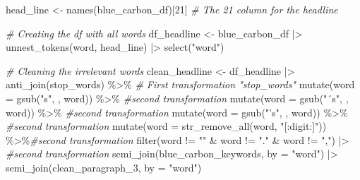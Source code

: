 \documentclass[
]{article}
\newenvironment{Shaded}{\begin{snugshade}}{\end{snugshade}}
\newcommand{\AttributeTok}[1]{\textcolor[rgb]{0.77,0.63,0.00}{#1}}
\newcommand{\CommentTok}[1]{\textcolor[rgb]{0.56,0.35,0.01}{\textit{#1}}}
\newcommand{\DecValTok}[1]{\textcolor[rgb]{0.00,0.00,0.81}{#1}}
\newcommand{\FunctionTok}[1]{\textcolor[rgb]{0.00,0.00,0.00}{#1}}
\newcommand{\NormalTok}[1]{#1}
\newcommand{\OtherTok}[1]{\textcolor[rgb]{0.56,0.35,0.01}{#1}}
\newcommand{\SpecialCharTok}[1]{\textcolor[rgb]{0.00,0.00,0.00}{#1}}
\newcommand{\StringTok}[1]{\textcolor[rgb]{0.31,0.60,0.02}{#1}}
\begin{document}
\begin{Shaded}
\begin{Highlighting}[]
\NormalTok{head\_line }\OtherTok{\textless{}{-}} \FunctionTok{names}\NormalTok{(blue\_carbon\_df)[}\DecValTok{21}\NormalTok{]  }\CommentTok{\# The 21 column for the headline}

\CommentTok{\# Creating the df with all words}
\NormalTok{df\_headline }\OtherTok{\textless{}{-}}\NormalTok{ blue\_carbon\_df }\SpecialCharTok{|\textgreater{}}
  \FunctionTok{unnest\_tokens}\NormalTok{(word, head\_line) }\SpecialCharTok{|\textgreater{}} 
  \FunctionTok{select}\NormalTok{(}\StringTok{"word"}\NormalTok{)}

\CommentTok{\# Cleaning the irrelevant words}
\NormalTok{clean\_headline }\OtherTok{\textless{}{-}}\NormalTok{ df\_headline }\SpecialCharTok{|\textgreater{}} 
  \FunctionTok{anti\_join}\NormalTok{(stop\_words) }\SpecialCharTok{\%\textgreater{}\%} \CommentTok{\# First transformation "stop\_words"}
  \FunctionTok{mutate}\NormalTok{(}\AttributeTok{word =} \FunctionTok{gsub}\NormalTok{(}\StringTok{"\textquotesingle{}s"}\NormalTok{, }\StringTok{\textquotesingle{}\textquotesingle{}}\NormalTok{, word)) }\SpecialCharTok{\%\textgreater{}\%} \CommentTok{\#second transformation}
  \FunctionTok{mutate}\NormalTok{(}\AttributeTok{word =} \FunctionTok{gsub}\NormalTok{(}\StringTok{"´s"}\NormalTok{, }\StringTok{\textquotesingle{}\textquotesingle{}}\NormalTok{, word)) }\SpecialCharTok{\%\textgreater{}\%} \CommentTok{\#second transformation}
   \FunctionTok{mutate}\NormalTok{(}\AttributeTok{word =} \FunctionTok{gsub}\NormalTok{(}\StringTok{"’s"}\NormalTok{, }\StringTok{\textquotesingle{}\textquotesingle{}}\NormalTok{, word)) }\SpecialCharTok{\%\textgreater{}\%} \CommentTok{\#second transformation}
  \FunctionTok{mutate}\NormalTok{(}\AttributeTok{word =} \FunctionTok{str\_remove\_all}\NormalTok{(word, }\StringTok{"[:digit:]"}\NormalTok{)) }\SpecialCharTok{\%\textgreater{}\%}\CommentTok{\#second transformation}
  \FunctionTok{filter}\NormalTok{(word }\SpecialCharTok{!=} \StringTok{""} \SpecialCharTok{\&}\NormalTok{ word }\SpecialCharTok{!=} \StringTok{"."} \SpecialCharTok{\&}\NormalTok{ word }\SpecialCharTok{!=} \StringTok{","}\NormalTok{) }\SpecialCharTok{|\textgreater{}} \CommentTok{\#second transformation}
  \FunctionTok{semi\_join}\NormalTok{(blue\_carbon\_keywords, }\AttributeTok{by =} \StringTok{"word"}\NormalTok{) }\SpecialCharTok{|\textgreater{}} 
  \FunctionTok{semi\_join}\NormalTok{(clean\_paragraph\_3, }\AttributeTok{by =} \StringTok{"word"}\NormalTok{)}
\end{Highlighting}
\end{Shaded}
\end{document}
